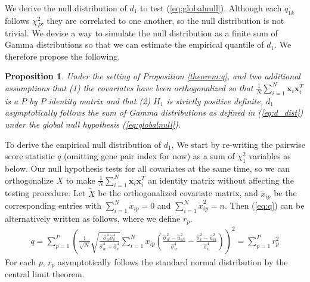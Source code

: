 \documentclass[aap,authoryear, preprint]{imsart}
\numberwithin{equation}{section}
\theoremstyle{plain}
\newtheorem{prop}{Proposition}
\begin{document}
We derive the null distribution of $d_1$ to test (\ref{eq:globalnull}). Although each ${q}_{1k}$ follows $\chi_{P}^2$, they are correlated to one another, so the null distribution is not trivial. We devise a way to simulate the null distribution as a finite sum of Gamma distributions so that we can estimate the empirical quantile of $d_1$. We therefore propose the following. 

\begin{prop}
Under the setting of Proposition \ref{theorem:q}, and two additional assumptions that (1) the covariates have been orthogonalized so that 
$\frac{1}{N} \sum_{i=1}^{N} \bm{x}_i \bm{x}_i^T$ is a $P$ by $P$ identity matrix and that (2) $H_1$ is strictly positive definite, $d_1$ asymptotically follows the sum of Gamma distributions as defined in (\ref{eq:d_dist}) under the global null hypothesis (\ref{eq:globalnull}). 
\end{prop}

To derive the empirical null distribution of $d_1$, We start by re-writing the pairwise score statistic $q$ (omitting gene pair index for now) as a sum of $\chi_1^2$ variables as below. Our null hypothesis tests for all covariates at the same time, so we can orthogonalize $X$ to make $\frac{1}{N} \sum_{i=1}^{N} \bm{x}_i \bm{x}_i^T$ an identity matrix without affecting the testing procedure. Let $\tilde{X}$ be the orthogonalized covariate matrix, and $\tilde{x}_{ip}$ be the corresponding entries with $\sum_{i=1}^{N}\tilde{x}_{ip} = 0$ and $\sum_{i=1}^{N} \tilde{x}_{ip}^2  = n$. Then (\ref{eq:q}) can be alternatively written as follows, where we define $r_{p}.$
\begin{align}
q = \sum_{p=1}^{P}
 \left(\frac{1}{\sqrt{N}}
 \sqrt{\frac{\hat{\sigma}_w^4 \hat{\sigma}_v^4}{\hat{\sigma}_w^4 + \hat{\sigma}_v^4}}
 \sum_{i=1}^{N} x_{ip} \left( \frac{\hat{\sigma}_w^2 - \hat{u}_{wi}^2}{\hat{\sigma}_w^4}
 - \frac{\hat{\sigma}_v^2 - \hat{u}_{vi}^2}{\hat{\sigma}_v^4}
 \right)
\right)^2 = \sum_{p=1}^{P}r_p^2
\label{eq:r}
\end{align}
For each $p$, $r_p$ asymptotically follows the standard normal distribution by the central limit theorem. \\
\end{document}

